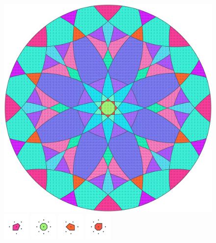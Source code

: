\documentclass[text.tex]{subfiles}
\begin{document}
\clearpage
\pagestyle{fancy}
\fancyhf{}
\begin{figure}[h!]
\centering
\includegraphics[width=1\textwidth]{img/results/circle8/circle8_107106_(-11_5alpha_1).pdf}
\includegraphics[width=0.12\textwidth]{img/results/circle8/circle8_107106_(-11_5alpha_1)_001.pdf}
\includegraphics[width=0.12\textwidth]{img/results/circle8/circle8_107106_(-11_5alpha_1)_002.pdf}
\includegraphics[width=0.12\textwidth]{img/results/circle8/circle8_107106_(-11_5alpha_1)_003.pdf}
\includegraphics[width=0.12\textwidth]{img/results/circle8/circle8_107106_(-11_5alpha_1)_004.pdf}

\end{figure}
\end{document}
